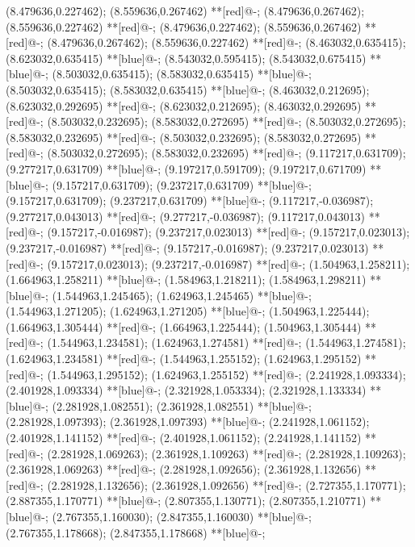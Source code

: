 (8.479636,0.227462); (8.559636,0.267462) **[red]@{-};
(8.479636,0.267462); (8.559636,0.227462) **[red]@{-};
(8.479636,0.227462); (8.559636,0.267462) **[red]@{-};
(8.479636,0.267462); (8.559636,0.227462) **[red]@{-};
(8.463032,0.635415); (8.623032,0.635415) **[blue]@{-};
(8.543032,0.595415); (8.543032,0.675415) **[blue]@{-};
(8.503032,0.635415); (8.583032,0.635415) **[blue]@{-};
(8.503032,0.635415); (8.583032,0.635415) **[blue]@{-};
(8.463032,0.212695); (8.623032,0.292695) **[red]@{-};
(8.623032,0.212695); (8.463032,0.292695) **[red]@{-};
(8.503032,0.232695); (8.583032,0.272695) **[red]@{-};
(8.503032,0.272695); (8.583032,0.232695) **[red]@{-};
(8.503032,0.232695); (8.583032,0.272695) **[red]@{-};
(8.503032,0.272695); (8.583032,0.232695) **[red]@{-};
(9.117217,0.631709); (9.277217,0.631709) **[blue]@{-};
(9.197217,0.591709); (9.197217,0.671709) **[blue]@{-};
(9.157217,0.631709); (9.237217,0.631709) **[blue]@{-};
(9.157217,0.631709); (9.237217,0.631709) **[blue]@{-};
(9.117217,-0.036987); (9.277217,0.043013) **[red]@{-};
(9.277217,-0.036987); (9.117217,0.043013) **[red]@{-};
(9.157217,-0.016987); (9.237217,0.023013) **[red]@{-};
(9.157217,0.023013); (9.237217,-0.016987) **[red]@{-};
(9.157217,-0.016987); (9.237217,0.023013) **[red]@{-};
(9.157217,0.023013); (9.237217,-0.016987) **[red]@{-};
(1.504963,1.258211); (1.664963,1.258211) **[blue]@{-};
(1.584963,1.218211); (1.584963,1.298211) **[blue]@{-};
(1.544963,1.245465); (1.624963,1.245465) **[blue]@{-};
(1.544963,1.271205); (1.624963,1.271205) **[blue]@{-};
(1.504963,1.225444); (1.664963,1.305444) **[red]@{-};
(1.664963,1.225444); (1.504963,1.305444) **[red]@{-};
(1.544963,1.234581); (1.624963,1.274581) **[red]@{-};
(1.544963,1.274581); (1.624963,1.234581) **[red]@{-};
(1.544963,1.255152); (1.624963,1.295152) **[red]@{-};
(1.544963,1.295152); (1.624963,1.255152) **[red]@{-};
(2.241928,1.093334); (2.401928,1.093334) **[blue]@{-};
(2.321928,1.053334); (2.321928,1.133334) **[blue]@{-};
(2.281928,1.082551); (2.361928,1.082551) **[blue]@{-};
(2.281928,1.097393); (2.361928,1.097393) **[blue]@{-};
(2.241928,1.061152); (2.401928,1.141152) **[red]@{-};
(2.401928,1.061152); (2.241928,1.141152) **[red]@{-};
(2.281928,1.069263); (2.361928,1.109263) **[red]@{-};
(2.281928,1.109263); (2.361928,1.069263) **[red]@{-};
(2.281928,1.092656); (2.361928,1.132656) **[red]@{-};
(2.281928,1.132656); (2.361928,1.092656) **[red]@{-};
(2.727355,1.170771); (2.887355,1.170771) **[blue]@{-};
(2.807355,1.130771); (2.807355,1.210771) **[blue]@{-};
(2.767355,1.160030); (2.847355,1.160030) **[blue]@{-};
(2.767355,1.178668); (2.847355,1.178668) **[blue]@{-};
